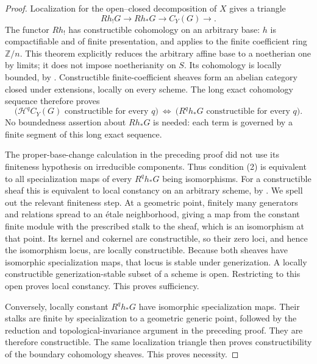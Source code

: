 \begin{proof}
Localization for the open--closed decomposition of $X$ gives a triangle
\[
 Rh_!G\longrightarrow Rh_*G\longrightarrow C_Y(G)\longrightarrow.
\]
The functor $Rh_!$ has constructible cohomology on an arbitrary base:
$h$ is compactifiable and of finite presentation, and
\cite[XVII, Theorem 5.3.6, p.~364]{SGA4D} applies to the finite
coefficient ring $\mathbb Z/n$. This theorem explicitly reduces the
arbitrary affine base to a noetherian one by limits; it does not impose
noetherianity on $S$. Its cohomology is locally bounded, by
\cite[XVII, Corollary 5.2.8.1, p.~358]{SGA4D}.
Constructible finite-coefficient sheaves form an abelian category
closed under extensions, locally on every scheme. The long exact
cohomology sequence therefore proves
\[
 \bigl(\mathcal H^q C_Y(G)\text{ constructible for every }q\bigr)
 \ \Longleftrightarrow\
 \bigl(R^q h_*G\text{ constructible for every }q\bigr).
\]
No boundedness assertion about $Rh_*G$ is needed: each term is governed
by a finite segment of this long exact sequence.

The proper-base-change calculation in the preceding proof did not
use its finiteness hypothesis on irreducible components. Thus condition
(2) is equivalent to all specialization maps of every $R^q h_*G$
being isomorphisms. For a constructible sheaf this is equivalent to
local constancy on an arbitrary scheme, by
\cite[IX, Proposition 2.11, p.~20]{SGA4D}.
We spell out the relevant finiteness step. At a geometric point,
finitely many generators and relations spread to an \'etale
neighborhood, giving a map from the constant finite module with the
prescribed stalk to the sheaf, which is an isomorphism at that point.
Its kernel and cokernel are constructible, so their zero loci, and
hence the isomorphism locus, are locally constructible. Because both
sheaves have isomorphic specialization maps, that locus is stable
under generization. A locally constructible generization-stable
subset of a scheme is open. Restricting to this open proves local
constancy. This proves sufficiency.

Conversely, locally constant $R^q h_*G$ have isomorphic specialization
maps. Their stalks are finite by specialization to a geometric generic
point, followed by the reduction and topological-invariance argument
in the preceding proof. They are therefore constructible. The same
localization triangle then proves constructibility of the boundary
cohomology sheaves. This proves necessity.
\end{proof}

